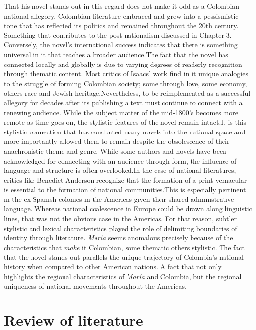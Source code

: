 \documentclass[12pt]{report}
\begin{document}
That his novel stands out in this regard does not make it odd as a Colombian national allegory. 
Colombian literature embraced and grew into a pessismistic tone that has reflected its politics and remained throughout the 20th century.
Something that contributes to the post-nationalism discussed in Chapter 3.
Conversely, the novel's international success indicates that there is something universal in it that reaches a broader audience.The fact that the novel has connected locally and globally is due to varying degrees of readerly recognition through thematic content.
Most critics of Isaacs' work find in it unique analogies to the struggle of forming Colombian society; some through love, some economy, others race and Jewish heritage.Nevertheless, to be reimplemented as a successful allegory for decades after its publishing a text must continue to connect with a renewing audience.
While the subject matter of the mid-1800's becomes more remote as time goes on, the stylistic features of the novel remain intact.It is this stylistic connection that has conducted many novels into the national space and more importantly allowed them to remain despite the obsolescence of their anachronistic theme and genre.
While some authors and novels have been acknowledged for connecting with an audience through form, the influence of language and structure is often overlooked.In the case of national literatures, critics like Benedict Anderson recognize that the formation of a print vernacular is essential to the formation of national communities.This is especially pertinent in the ex-Spanish colonies in the Americas given their shared administrative language. 
Whereas national coalescence in Europe could be drawn along linguistic lines, that was not the obvious case in the Americas. For that reason, subtler stylistic and lexical characteristics played the role of delimiting boundaries of identity through literature. 
\textit{María} seems anomalous precisely because of the characteristics that \textit{make} it Colombian, some thematic others stylistic.
The fact that the novel stands out parallels the unique trajectory of Colombia's national history when compared to other American nations. 
A fact that not only highlights the regional characteristics of \textit{María} and Colombia, but the regional uniqueness of national movements throughout the Americas.


\section{Review of literature}
\end{document}
